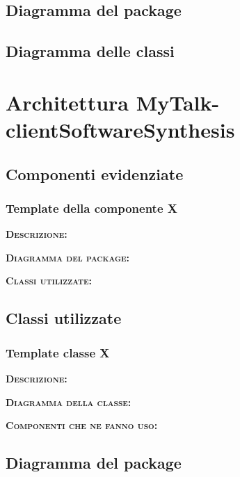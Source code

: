 \subsection{Diagramma del package}

\subsection{Diagramma delle classi}
\clearpage

\section{Architettura MyTalk-clientSoftwareSynthesis}

\subsection{Componenti evidenziate}

\subsubsection{Template della componente X}
\begin{description}
	\item{\scshape\bfseries Descrizione:} 
	\item{\scshape\bfseries Diagramma del package:}
	\item{\scshape\bfseries Classi utilizzate:} 
\end{description}

\subsection{Classi utilizzate}

\subsubsection{Template classe X}
\begin{description}
	\item{\scshape\bfseries Descrizione:} 
	\item{\scshape\bfseries Diagramma della classe:}
	\item{\scshape\bfseries Componenti che ne fanno uso:} 
\end{description}

\subsection{Diagramma del package}

